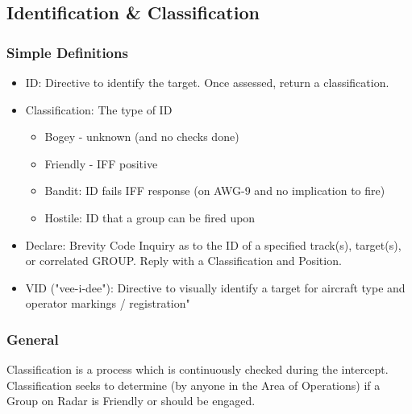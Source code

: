 \subsection{Identification \& Classification}

\subsubsection*{Simple Definitions}

\begin{itemize}
  \item ID: Directive to identify the target. Once assessed, return a
    classification.

  \item Classification: The type of ID

  \begin{itemize}
    \item Bogey - unknown (and no checks done)
    \item Friendly - IFF positive
    \item Bandit: ID fails IFF response (on AWG-9 and no implication to fire)
    \item Hostile: ID that a group can be fired upon
  \end{itemize}

  \item Declare: Brevity Code Inquiry as to the ID of a specified track(s),
    target(s), or correlated GROUP. Reply with a Classification and Position.

  \item VID ("vee-i-dee"): Directive to visually identify a target for aircraft
    type and operator markings / registration"

\end{itemize}

\subsubsection*{General}

Classification is a process which is continuously checked during the
intercept. Classification seeks to determine (by anyone in the Area of
Operations) if a Group on Radar is Friendly or should be engaged.


